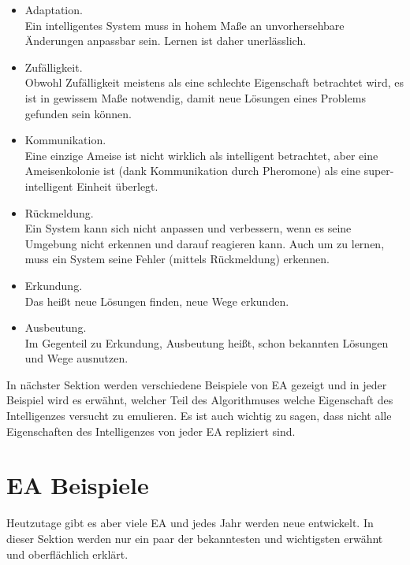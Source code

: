 \documentclass[twoside,twocolumn]{article}
\begin{document}
\begin{itemize}
\item{Adaptation.}\\
Ein intelligentes System muss in hohem Maße an unvorhersehbare Änderungen anpassbar sein. Lernen ist daher unerlässlich.\\
\item{Zufälligkeit.}\\
Obwohl Zufälligkeit meistens als eine schlechte Eigenschaft betrachtet wird, es ist in gewissem Maße notwendig, damit neue Lösungen eines Problems gefunden sein können.\\
\item{Kommunikation.}\\
Eine einzige Ameise ist nicht wirklich als intelligent betrachtet, aber eine Ameisenkolonie ist (dank Kommunikation durch Pheromone) als eine super-intelligent Einheit überlegt.\\
\item{Rückmeldung.}\\
Ein System kann sich nicht anpassen und verbessern, wenn es seine Umgebung nicht erkennen und darauf reagieren kann. Auch um zu lernen, muss ein System seine Fehler (mittels Rückmeldung) erkennen.\\
\item{Erkundung.}\\
Das heißt neue Lösungen finden, neue Wege erkunden.\\
\item{Ausbeutung.}\\
Im Gegenteil zu Erkundung, Ausbeutung heißt, schon bekannten Lösungen und Wege ausnutzen.
\end{itemize}

In nächster Sektion werden verschiedene Beispiele von EA gezeigt und in jeder Beispiel wird es erwähnt, welcher Teil des Algorithmuses welche Eigenschaft des Intelligenzes versucht zu emulieren. Es ist auch wichtig zu sagen, dass nicht alle Eigenschaften des Intelligenzes von jeder EA repliziert sind.


\section{EA Beispiele}

Heutzutage gibt es aber viele EA und jedes Jahr werden neue entwickelt. In dieser Sektion werden nur ein paar der bekanntesten und wichtigsten erwähnt und oberflächlich erklärt.
\end{document}
